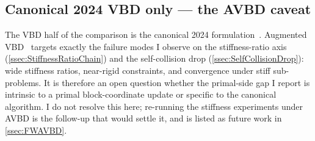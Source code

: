 \subsection{Canonical 2024 VBD only --- the AVBD caveat}
\label{ssec:ThreatAVBD}
The VBD half of the comparison is the canonical 2024 formulation~\cite{Chen2024}.
Augmented VBD~\cite{Giles2025} targets exactly the failure modes I observe on
the stiffness-ratio axis (\autoref{ssec:StiffnessRatioChain}) and the
self-collision drop (\autoref{ssec:SelfCollisionDrop}): wide stiffness ratios,
near-rigid constraints, and convergence under stiff sub-problems. It is
therefore an open question whether the primal-side gap I report is intrinsic to
a primal block-coordinate update or specific to the canonical algorithm. I do
not resolve this here; re-running the stiffness experiments under AVBD is the
follow-up that would settle it, and is listed as future work in
\autoref{ssec:FWAVBD}.